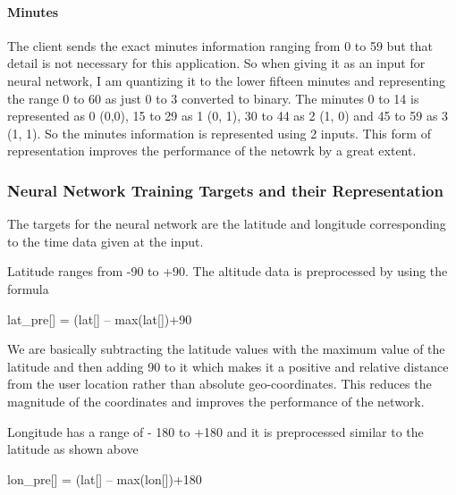 \documentclass[conference]{IEEEtran}
\begin{document}
\paragraph{Minutes}
The client sends the exact minutes information ranging from 0 to 59 but that detail is not necessary for this application. So when giving it as an input for neural network, I am quantizing it to the lower fifteen minutes and representing the range 0 to 60 as just 0 to 3 converted to binary. The minutes 0 to 14 is represented as 0 (0,0), 15 to 29 as 1 (0, 1), 30 to 44 as 2 (1, 0) and 45 to 59 as 3 (1, 1). So the minutes information is represented using 2 inputs. This form of representation improves the performance of the netowrk by a great extent.

\subsubsection{Neural Network Training Targets and their Representation}
The targets for the neural network are the latitude and longitude corresponding to the time data given at the input.

Latitude ranges from -90 to +90. The altitude data is preprocessed by using the formula 

lat\_pre[] = (lat[] – max(lat[])+90

We are basically subtracting the latitude values with the maximum value of the latitude and then adding 90 to it which makes it a positive and relative distance from the user location rather than absolute geo-coordinates. This reduces the magnitude of the coordinates and improves the performance of the network.

Longitude has a range of - 180 to +180 and it is preprocessed similar to the latitude as shown above 

lon\_pre[] = (lat[] – max(lon[])+180


\end{document}
